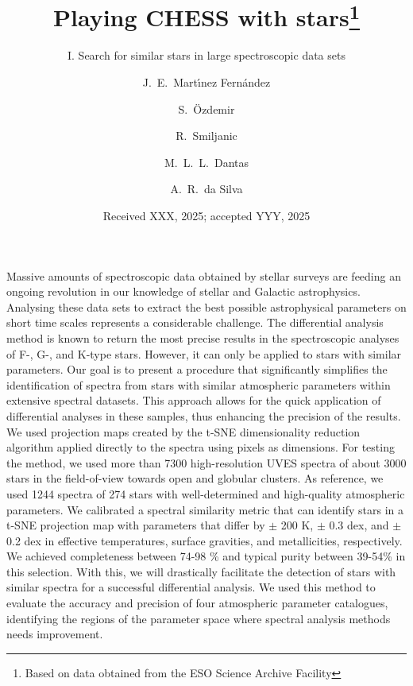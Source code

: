 \documentclass{aa}
\begin{document}
   \title{Playing CHESS with stars\thanks{Based on data obtained from the ESO Science Archive Facility}}

   \subtitle{I. Search for similar stars in large spectroscopic data sets}



   \author{J.~E.~Mart\'{\i}nez Fern\'andez
          \and
          S.~\"Ozdemir
          \and
          R.~Smiljanic
          \and
          M.~L.~L.~Dantas
          \and
          A.~R.~da Silva
          }


   \date{Received XXX, 2025; accepted YYY, 2025}

 
  \abstract
   {Massive amounts of spectroscopic data obtained by stellar surveys are feeding an ongoing revolution in our knowledge of stellar and Galactic astrophysics. Analysing these data sets to extract the best possible astrophysical parameters on short time scales represents a considerable challenge.}
   {The differential analysis method is known to return the most precise results in the spectroscopic analyses of F-, G-, and K-type stars. However, it can only be applied to stars with similar parameters. Our goal is to present a procedure that significantly simplifies the identification of spectra from stars with similar atmospheric parameters within extensive spectral datasets. This approach allows for the quick application of differential analyses in these samples, thus enhancing the precision of the results.}
   {We used projection maps created by the t-SNE dimensionality reduction algorithm applied directly to the spectra using pixels as dimensions. For testing the method, we used more than 7300 high-resolution UVES spectra of about 3000 stars in the field-of-view towards open and globular clusters. As reference, we used 1244 spectra of 274 stars with well-determined and high-quality atmospheric parameters.}
   {We calibrated a spectral similarity metric that can identify stars in a t-SNE projection map with parameters that differ by $\pm$ 200 K, $\pm$ 0.3 dex, and $\pm$ 0.2 dex in effective temperatures, surface gravities, and metallicities, respectively. We achieved completeness between 74-98 \% and typical purity between 39-54\% in this selection. With this, we will drastically facilitate the detection of stars with similar spectra for a successful differential analysis. We used this method to evaluate the accuracy and precision of four atmospheric parameter catalogues, identifying the regions of the parameter space where spectral analysis methods needs improvement.}
   {}
\end{document}
